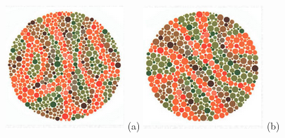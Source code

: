\documentclass[	12pt, Times, openright, twoside, a4paper, english, brazil]{abntex2}
\begin{document}
\begin{apendicesenv}
\begin{figure}[!htb]
\centering
{\includegraphics[width=\linewidth]{ishihara-digitoescondido/figureIshihara18.png}}
(a)
\endminipage\hfill
{}
\centering
{\includegraphics[width=\linewidth]{ishihara-digitoescondido/figureIshihara19.png}}
(b)
\endminipage\hfill


\end{figure}
\end{apendicesenv}
\end{document}
